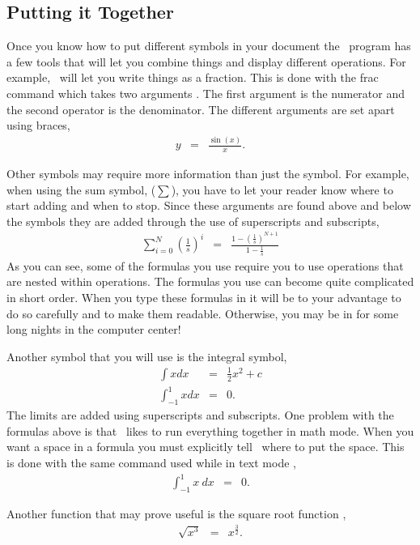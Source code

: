 \subsection{Putting it Together}
Once you know how to put different symbols in your document the \lat\ 
program has a few tools that will let you combine things and display
different operations.  For example, \lat\ will let you write things
as a fraction.  This is done with the frac command which takes two
arguments \cite{The-Manual}.  The first argument is the numerator and the second operator
is the denominator.  The different arguments are set apart using braces,
\begin{eqnarray}
   y & = & \frac{\sin(x)}{x}.
\end{eqnarray}

Other symbols may require more information than just the symbol.  For
example, when using the sum symbol, ($\sum$), you have to let your
reader know where to start adding and when to stop.  Since these
arguments are found above and below the symbols they are added through
the use of superscripts and subscripts,
\begin{eqnarray}
   \sum^{N}_{i=0}  \left( \frac{1}{s} \right)^i
             & = & \frac{1 - \left( \frac{1}{s}\right)^{N+1}}
                        {1-\frac{1}{s}}
\end{eqnarray}
As you can see, some of the formulas you use require you to use
operations that are nested within operations.  The formulas you use
can become quite complicated in short order.  When you type these
formulas in it will be to your advantage to do so carefully and to
make them readable.  Otherwise, you may be in for some long nights
in the computer center!

Another symbol that you will use is the integral symbol,
\begin{eqnarray}
\int        x dx & = & \frac{1}{2} x^2 + c \\
\int^1_{-1} x dx & = & 0. \nonumber
\end{eqnarray}
The limits are added using superscripts and subscripts.
One problem with the formulas above is that \lat\ likes
to run everything together in math mode.  When you want a
space in a formula you must explicitly tell \lat\ where
to put the space.  This is done with the same command
used while in text mode \cite{The-Manual},
\begin{eqnarray}
\int^1_{-1} x \ dx & = & 0.
\end{eqnarray}


Another function that may prove useful is the square
root function \cite{The-Manual},
\begin{eqnarray}
\sqrt{x^3} & = & x^{\frac{3}{2}}. 
\end{eqnarray}

